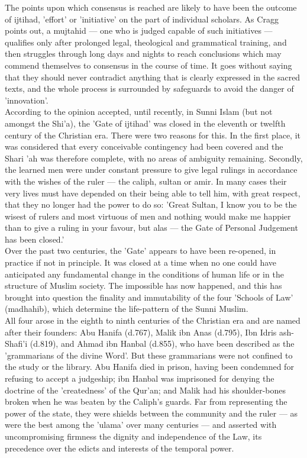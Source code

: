 \documentclass[10pt, twoside]{book}
\begin{document}
The points upon which consensus is reached are likely to have been the outcome of ijtihad, 'effort' 
or 'initiative' on the part of individual scholars. As Cragg points out, a mujtahid --- one who is 
judged capable of such initiatives --- qualifies only after prolonged legal, theological and 
grammatical training, and then struggles through long days and nights to reach conclusions which may 
commend themselves to consensus in the course of time. It goes without saying that they should never 
contradict anything that is clearly expressed in the sacred texts, and the whole process is 
surrounded by safeguards to avoid the danger of 'innovation'. \\

According to the opinion accepted, until recently, in Sunni Islam (but not amongst the Shi'a), the 
'Gate of ijtihad' was closed in the eleventh or twelfth century of the Christian era. There were two 
reasons for this. In the first place, it was considered that every conceivable contingency had been 
covered and the Shari 'ah was therefore complete, with no areas of ambiguity remaining. Secondly, the 
learned men were under constant pressure to give legal rulings in accordance with the wishes of the 
ruler --- the caliph, sultan or amir. In many cases their very lives must have depended on their being 
able to tell him, with great respect, that they no longer had the power to do so: 'Great Sultan, I 
know you to be the wisest of rulers and most virtuous of men and nothing would make me happier than 
to give a ruling in your favour, but alas --- the Gate of Personal Judgement has been closed.' \\

Over the past two centuries, the 'Gate' appears to have been re\hyp{}opened, in practice if not in 
principle. It was closed at a time when no one could have anticipated any fundamental change in the 
conditions of human life or in the structure of Muslim society. The impossible has now happened, and 
this has brought into question the finality and immutability of the four 'Schools of Law' (madhahib), 
which determine the life\hyp{}pattern of the Sunni Muslim. \\

All four arose in the eighth to ninth centuries of the Christian era and are named after their 
founders: Abu Hanifa (d.767), Malik ibn Anas (d.795), Ibn Idris ash\hyp{}Shafi'i (d.819), and Ahmad ibn 
Hanbal (d.855), who have been described as the 'grammarians of the divine Word'. But these 
grammarians were not confined to the study or the library. Abu Hanifa died in prison, having been 
condemned for refusing to accept a judgeship; ibn Hanbal was imprisoned for denying the doctrine of 
the 'createdness' of the Qur'an; and Malik had his shoulder\hyp{}bones broken when he was beaten by the 
Caliph's guards. Far from representing the power of the state, they were shields between the 
community and the ruler --- as were the best among the 'ulama' over many centuries --- and asserted with 
uncompromising firmness the dignity and independence of the Law, its precedence over the edicts and 
interests of the temporal power. \\
\end{document}
